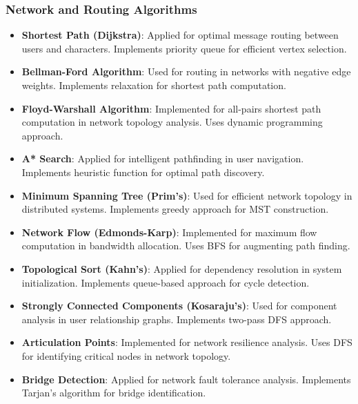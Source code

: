 \documentclass[conference]{IEEEtran}
\begin{document}
\subsubsection{Network and Routing Algorithms}
\begin{itemize}
\item \textbf{Shortest Path (Dijkstra)}: Applied for optimal message routing between users and characters. Implements priority queue for efficient vertex selection.
\item \textbf{Bellman-Ford Algorithm}: Used for routing in networks with negative edge weights. Implements relaxation for shortest path computation.
\item \textbf{Floyd-Warshall Algorithm}: Implemented for all-pairs shortest path computation in network topology analysis. Uses dynamic programming approach.
\item \textbf{A* Search}: Applied for intelligent pathfinding in user navigation. Implements heuristic function for optimal path discovery.
\item \textbf{Minimum Spanning Tree (Prim's)}: Used for efficient network topology in distributed systems. Implements greedy approach for MST construction.
\item \textbf{Network Flow (Edmonds-Karp)}: Implemented for maximum flow computation in bandwidth allocation. Uses BFS for augmenting path finding.
\item \textbf{Topological Sort (Kahn's)}: Applied for dependency resolution in system initialization. Implements queue-based approach for cycle detection.
\item \textbf{Strongly Connected Components (Kosaraju's)}: Used for component analysis in user relationship graphs. Implements two-pass DFS approach.
\item \textbf{Articulation Points}: Implemented for network resilience analysis. Uses DFS for identifying critical nodes in network topology.
\item \textbf{Bridge Detection}: Applied for network fault tolerance analysis. Implements Tarjan's algorithm for bridge identification.
\end{itemize}
\end{document}
